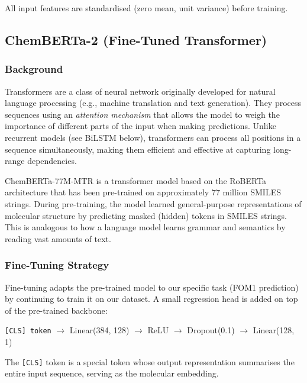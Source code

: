\documentclass[11pt,a4paper]{article}
\begin{document}
All input features are standardised (zero mean, unit variance) before training.

\subsection{ChemBERTa-2 (Fine-Tuned Transformer)}

\subsubsection*{Background}

Transformers are a class of neural network originally developed for natural language processing (e.g., machine translation and text generation). They process sequences using an \emph{attention mechanism} that allows the model to weigh the importance of different parts of the input when making predictions. Unlike recurrent models (see BiLSTM below), transformers can process all positions in a sequence simultaneously, making them efficient and effective at capturing long-range dependencies.

ChemBERTa-77M-MTR is a transformer model based on the RoBERTa architecture that has been pre-trained on approximately 77 million SMILES strings. During pre-training, the model learned general-purpose representations of molecular structure by predicting masked (hidden) tokens in SMILES strings. This is analogous to how a language model learns grammar and semantics by reading vast amounts of text.

\subsubsection*{Fine-Tuning Strategy}

Fine-tuning adapts the pre-trained model to our specific task (FOM1 prediction) by continuing to train it on our dataset. A small regression head is added on top of the pre-trained backbone:

\begin{center}
\texttt{[CLS] token} $\rightarrow$ Linear(384, 128) $\rightarrow$ ReLU $\rightarrow$ Dropout(0.1) $\rightarrow$ Linear(128, 1)
\end{center}

The \texttt{[CLS]} token is a special token whose output representation summarises the entire input sequence, serving as the molecular embedding.
\end{document}
